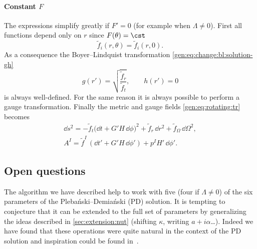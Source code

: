 \paragraph{Constant $F$}

The expressions simplify greatly if $F' = 0$ (for example when $\Lambda \neq 0$).
First all functions depend only on $r$ since $F(\theta) = \cst$
\begin{equation}
	\tilde f_i(r, \theta) = \tilde f_i(r, 0).
\end{equation} 
As a consequence the Boyer--Lindquist transformation \eqref{gen:eq:change:bl:solution-gh}
\begin{equation}
	g(r') = \sqrt{\frac{\tilde f_r}{\tilde f_t}}, \qquad
	h(r') = 0
\end{equation} 
is always well-defined.
For the same reason it is always possible to perform a gauge transformation.
Finally the metric and gauge fields \eqref{gen:eq:rotating:tr} becomes
\begin{subequations}
\label{gen:eq:rotating:tr-F-cst}
\begin{gather}
	\dd s^2 = - \tilde f_t \big(\dd t + G' H\, \dd\phi \big)^2
		+ \tilde f_r\, \dd r^2
		+ \tilde f_\Omega\, \dd\Omega^2, \\
	A^I = \tilde f^I\, \left(\dd t' + G' H\, \dd \phi' \right) + p^I H'\, \dd\phi'.
\end{gather}
\end{subequations}


\subsection{Open questions}


The algorithm we have described help to work with five (four if $\Lambda \neq 0$) of the six parameters of the Plebański--Demiański (PD) solution.
It is tempting to conjecture that it can be extended to the full set of parameters by generalizing the ideas described in \cref{sec:extension:nut} (shifting $\kappa$, writing $a + i \alpha$…).
Indeed we have found that these operations were quite natural in the context of the  PD solution and inspiration could be found in~\cite{Griffiths:2006:NewLookPlebanskiDemianski}.
